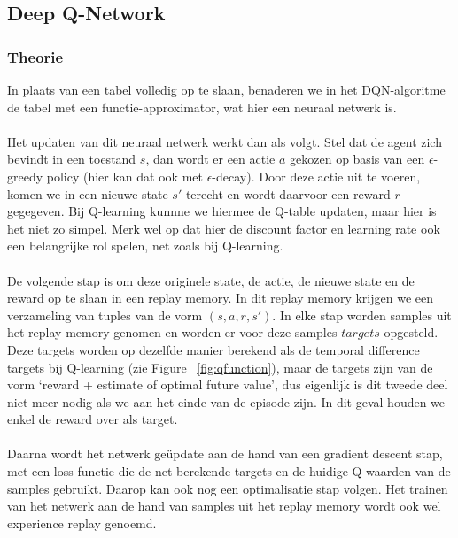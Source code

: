 \documentclass[11pt]{article}
\begin{document}
\subsection{Deep Q-Network}
\subsubsection{Theorie}
In plaats van een tabel volledig op te slaan, benaderen we in het DQN-algoritme de tabel met een functie-approximator, wat hier een neuraal netwerk is.\\\\
Het updaten van dit neuraal netwerk werkt dan als volgt. Stel dat de agent zich bevindt in een toestand $s$, dan wordt er een actie $a$ gekozen op basis van een $\epsilon$-greedy policy (hier kan dat ook met $\epsilon$-decay). Door deze actie uit te voeren, komen we in een nieuwe state $s'$ terecht en wordt daarvoor een reward $r$ gegegeven. Bij Q-learning kunnne we hiermee de Q-table updaten, maar hier is het niet zo simpel. Merk wel op dat hier de discount factor en learning rate ook een belangrijke rol spelen, net zoals bij Q-learning.\\\\
De volgende stap is om deze originele state, de actie, de nieuwe state en de reward op te slaan in een replay memory. In dit replay memory krijgen we een verzameling van tuples van de vorm $(s,a,r,s')$. In elke stap worden samples uit het replay memory genomen en worden er voor deze samples $targets$ opgesteld. Deze targets worden op dezelfde manier berekend als de temporal difference targets bij Q-learning (zie Figure ~\ref{fig:qfunction}), maar de targets zijn van de vorm `reward + estimate of optimal future value', dus eigenlijk is dit tweede deel niet meer nodig als we aan het einde van de episode zijn. In dit geval houden we enkel de reward over als target. \\\\
Daarna wordt het netwerk geüpdate aan de hand van een gradient descent stap, met een loss functie die de net berekende targets en de huidige Q-waarden van de samples gebruikt. Daarop kan ook nog een optimalisatie stap volgen. Het trainen van het netwerk aan de hand van samples uit het replay memory wordt ook wel experience replay genoemd.
\end{document}
